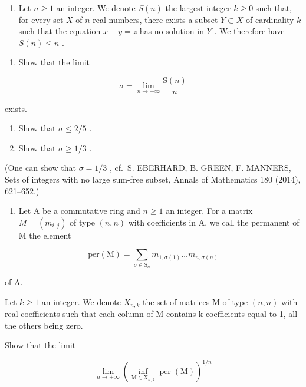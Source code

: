 \begin{enumerate}
\def\labelenumi{\arabic{enumi})}
\setcounter{enumi}{3}
\tightlist
\item
  Let \(n \geqslant 1\) an integer. We denote \(S(n)\) the largest integer \(k \geqslant 0\) such that, for every set \(X\) of \(n\) real numbers, there exists a subset \(Y \subset X\) of cardinality \(k\) such that the equation \(x + y = z\) has no solution in \(Y\) . We therefore have \(S(n) \leqslant n\) .
\end{enumerate}

\begin{enumerate}
\def\labelenumi{\alph{enumi})}
\tightlist
\item
  Show that the limit
\end{enumerate}

\[
\sigma = \lim _ {n \to + \infty} \frac {\mathrm{S} (n)}{n}
\]

exists.

\begin{enumerate}
\def\labelenumi{\alph{enumi})}
\setcounter{enumi}{1}
\item
  Show that \(\sigma \leqslant 2 / 5\) .
\item
  Show that \(\sigma \geqslant 1 / 3\) .
\end{enumerate}

(One can show that \(\sigma = 1/3\) , cf.~S. EBERHARD, B. GREEN, F. MANNERS, Sets of integers with no large sum-free subset, Annals of Mathematics 180 (2014), 621--652.)

\begin{enumerate}
\def\labelenumi{\arabic{enumi})}
\setcounter{enumi}{4}
\tightlist
\item
  Let A be a commutative ring and \(n \geqslant 1\) an integer. For a matrix \(M = (m_{i,j})\) of type \((n, n)\) with coefficients in A, we call the permanent of M the element
\end{enumerate}

\[
\mathrm{per(M)} = \sum_ {\sigma \in \mathrm{S} _ {n}} m _ {1, \sigma (1)} \dots m _ {n, \sigma (n)}
\]

of A.

Let \(k \geqslant 1\) an integer. We denote \(X_{n,k}\) the set of matrices M of type \((n, n)\) with real coefficients such that each column of M contains k coefficients equal to 1, all the others being zero.

Show that the limit

\[
\lim _ {n \to + \infty} \left(\inf _ {\mathrm{M} \in \mathrm{X} _ {n, k}} \operatorname{per} (\mathrm{M})\right) ^ {1 / n}
\]

